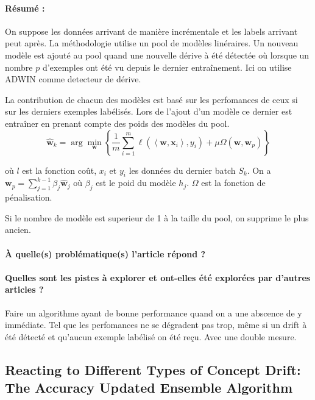 \documentclass[11pt,a4paper]{report}
\begin{document}
\paragraph{Résumé :} On suppose les données arrivant de manière incrémentale et les labels arrivant peut après. La méthodologie utilise un pool de modèles linéraires. Un nouveau modèle est ajouté au pool quand une nouvelle dérive à été détectée où lorsque un nombre $p$ d'exemples ont été vu depuis le dernier entraînement. Ici on utilise ADWIN comme detecteur de dérive. 

La contribution de chacun des modèles est basé sur les perfomances de ceux si sur les derniers exemples labélisés. Lors de l'ajout d'un modèle ce dernier est entraîner en prenant compte des poids des modèles du pool. $$\hat{\mathbf{w}}_{k}=\arg \min _{\mathbf{w}}\left\{\frac{1}{m} \sum_{i=1}^{m} \ell\left(\left\langle\mathbf{w}, \mathbf{x}_{i}\right\rangle, y_{i}\right)+\mu \Omega\left(\mathbf{w}, \mathbf{w}_{p}\right)\right\}$$

où $l$ est la fonction coût, $x_i$ et $y_i$ les données du dernier batch $S_k$. On a $\mathbf{w}_{p}=\sum_{j=1}^{k-1} \beta_{j} \hat{\mathbf{w}}_{j}$ où $\beta_j$ est le poid du modèle $h_j$. $\Omega$ est la fonction de pénalisation.

Si le nombre de modèle est superieur de 1 à la taille du pool, on supprime le plus ancien.

\paragraph{À quelle(s) problématique(s) l'article répond ?} 

\paragraph{Quelles sont les pistes à explorer et ont-elles  été explorées par d'autres articles ?}  Faire un algorithme ayant de bonne performance quand on a une abscence de y immédiate. Tel que les perfomances ne se dégradent pas trop, même si un drift à été détecté et qu'aucun exemple labélisé on été reçu. Avec une double mesure.








\subsection{Reacting to Different Types of Concept Drift: The Accuracy Updated Ensemble Algorithm}
\end{document}
